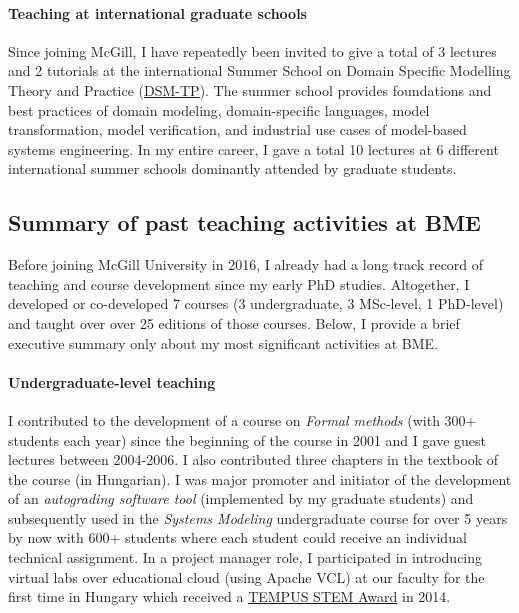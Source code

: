 \paragraph{Teaching at international graduate schools}
Since joining McGill, I have repeatedly been invited to give a total of 3 lectures and 2 tutorials at the international Summer School on Domain Specific Modelling Theory and Practice (\href{http://msdl.cs.mcgill.ca/conferences/dsm-tp-2017}{DSM-TP}). The summer school provides foundations and best practices of domain modeling, domain-specific languages, model transformation, model verification, and industrial use cases of model-based systems engineering.
In my entire career, I gave a total 10 lectures at 6 different international summer schools dominantly attended by graduate students.

\subsection{Summary of past teaching activities at BME}

Before joining McGill University in 2016, I already had a long track record of teaching and course development since my early PhD studies. Altogether, I developed or co-developed 7 courses (3 undergraduate, 3 MSc-level, 1 PhD-level) and taught  over over 25 editions of those courses. Below, I provide a brief executive summary only about my most significant activities at BME. 

\paragraph{Undergraduate-level teaching}
I contributed to the development of a course on \emph{Formal methods} (with 300+ students each year) since the beginning of the course in 2001 and I gave  guest lectures between 2004-2006. I also contributed three chapters in the textbook of the course (in Hungarian).  
I was major promoter and initiator of the development of an \emph{autograding software tool} (implemented by my graduate students) and subsequently used in the \emph{Systems Modeling} undergraduate course for over 5 years by now with 600+ students where each student could receive an individual technical assignment. 
In a project manager role, I participated in introducing virtual labs over educational cloud (using Apache VCL) at our faculty for the first time in Hungary which received a \href{https://inf.mit.bme.hu/en/news/2014/02/tempus-stem-call-apache-vcl-based-labs-won-prize}{TEMPUS STEM Award} in 2014. 


